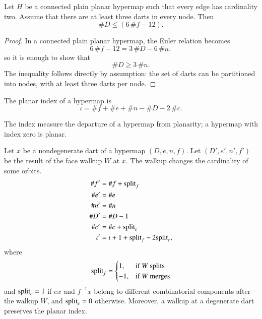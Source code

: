 \begin{lemma}\label{lemma:dart-upper} 
Let $H$ be a connected plain planar hypermap such that every edge
has cardinality two.  Assume that there are at least three darts in
every node.  Then
\[ 
\# D \le (6\, \#f - 12).
\] 
\end{lemma}
%

\begin{proof}  In a connected plain planar hypermap, the Euler relation becomes
\[ 6\, \#f - 12 = 3\,\#D - 6\,\#n,\] 
so it is enough to show that
\[ 
\# D \ge 3\,\#n.
\] 
The inequality follows directly by assumption: the set of darts can be
partitioned into nodes, with at least three darts per node.
\end{proof}


\begin{definition}
The planar index of a hypermap is
\[ \iota = \# f + \# e + \# n - \# D - 2\,\#
c.\] 
%
%
\end{definition}

The index measure the departure of a hypermap from planarity; a
hypermap with index zero is planar.

\begin{lemma}\label{lemma:index} 
Let $x$ be a nondegenerate dart of a hypermap $(D,e,n,f)$. Let
$(D',e',n',f')$ be the result of the face walkup $W$ at $x$.  The
walkup changes the cardinality of some orbits.
\begin{align*}
\# f' &=\# f +{\operatorname{split}}_f  \\  
\# e'&=\# e \\
\# n'&=\# n \\
\# D'&=\# D - 1 \\
\#c'&=\# c + {\operatorname{split}}_c\\
\iota' &= \iota + 1+{\operatorname{split}}_f - 2{\operatorname{split}}_c,\\
\end{align*}
where
\[ 
{\operatorname{split}}_f = \begin{cases}
1,&\text{if $W$ splits }\\
-1,&\text{if $W$ merges}\\
\end{cases}
\] 
and ${\operatorname{split}}_c=1$ if $e x$ and $f^{-1} x$ belong to different
combinatorial components after the walkup $W$, and ${\operatorname{split}}_c=0$
otherwise. Moreover, a walkup at a degenerate dart preserves the
planar index.  %
%
%
\end{lemma}

